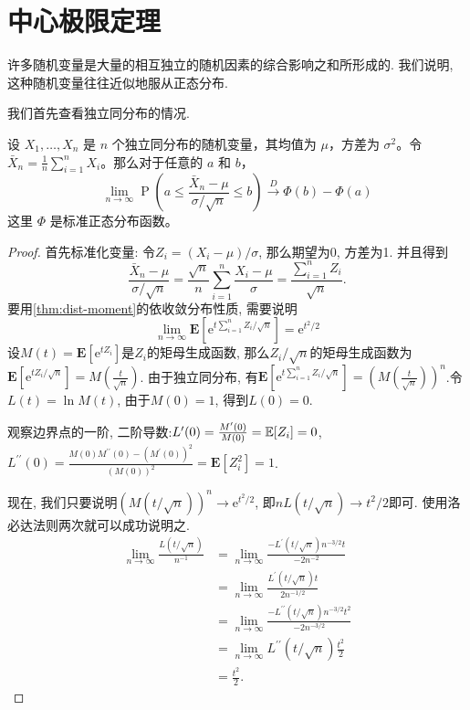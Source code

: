 \section{中心极限定理}

许多随机变量是大量的相互独立的随机因素的综合影响之和所形成的. 我们说明, 这种随机变量往往近似地服从正态分布.

我们首先查看独立同分布的情况. 

\begin{theorem}[中心极限定理]
    \label{thm:clt-iid}
    设 $X_1, \ldots, X_n$ 是 $n$ 个独立同分布的随机变量，其均值为 $\mu$，方差为 $\sigma^2$。令 $\bar{X}_n=\frac{1}{n} \sum_{i=1}^n X_i$。那么对于任意的 $a$ 和 $b$，
    $$
    \lim _{n \rightarrow \infty} \operatorname{P}\left(a \leq \frac{\bar{X}_n-\mu}{\sigma / \sqrt{n}} \leq b\right) \stackrel{D}{\longrightarrow} \Phi(b)-\Phi(a)
    $$
    这里 $\Phi$ 是标准正态分布函数。
        \end{theorem}

    \begin{proof}
        首先标准化变量: 令$Z_i=\left(X_i-\mu\right) / \sigma$, 那么期望为0, 方差为1. 并且得到$$
            \frac{\bar{X}_n-\mu}{\sigma / \sqrt{n}}=\frac{\sqrt{n}}{n} \sum_{i=1}^n \frac{X_i-\mu}{\sigma}=\frac{\sum_{i=1}^n Z_i}{\sqrt{n}} .
            $$
            要用\cref{thm:dist-moment}的依收敛分布性质, 需要说明$$
            \lim _{n \rightarrow \infty} \mathbf{E}\left[\mathrm{e}^{t \sum_{i=1}^n Z_i / \sqrt{n}}\right]=\mathrm{e}^{t^2 / 2}
            $$
            设$M(t)=\mathbf{E}\left[\mathrm{e}^{t Z_i}\right]$是$Z_i$的矩母生成函数, 那么$Z_i / \sqrt{n}$的矩母生成函数为$\mathbf{E}\left[\mathrm{e}^{t Z_i / \sqrt{n}}\right]=M\left(\frac{t}{\sqrt{n}}\right)$. 由于独立同分布, 有$\mathbf{E}\left[\mathrm{e}^{t \sum_{i=1}^n Z_i / \sqrt{n}}\right]=\left(M\left(\frac{t}{\sqrt{n}}\right)\right)^n$.令$L(t)=\ln M(t)$, 由于$M(0)=1$, 得到$L(0)=0$.

            观察边界点的一阶, 二阶导数:$L^{\prime}(0)=\frac{M^{\prime}(0)}{M(0)}=\mathbb E[Z_i]=0$, $L^{\prime \prime}(0)=\frac{M(0) M^{\prime \prime}(0)-\left(M^{\prime}(0)\right)^2}{(M(0))^2}=\mathbf{E}\left[Z_i^2\right]=1$.

            现在, 我们只要说明$(M(t / \sqrt{n}))^n \rightarrow \mathrm{e}^{t^2 / 2}$, 即$n L(t / \sqrt{n}) \rightarrow t^2 / 2$即可. 
            使用洛必达法则两次就可以成功说明之.
        $$\begin{aligned} \lim _{n \rightarrow \infty} \frac{L(t / \sqrt{n})}{n^{-1}} & =\lim _{n \rightarrow \infty} \frac{-L^{\prime}(t / \sqrt{n}) n^{-3 / 2} t}{-2 n^{-2}} \\ & =\lim _{n \rightarrow \infty} \frac{L^{\prime}(t / \sqrt{n}) t}{2 n^{-1 / 2}} \\ & =\lim _{n \rightarrow \infty} \frac{-L^{\prime \prime}(t / \sqrt{n}) n^{-3 / 2} t^2}{-2 n^{-3 / 2}} \\ & =\lim _{n \rightarrow \infty} L^{\prime \prime}(t / \sqrt{n}) \frac{t^2}{2} \\ & =\frac{t^2}{2} .\end{aligned}$$

    \end{proof}

